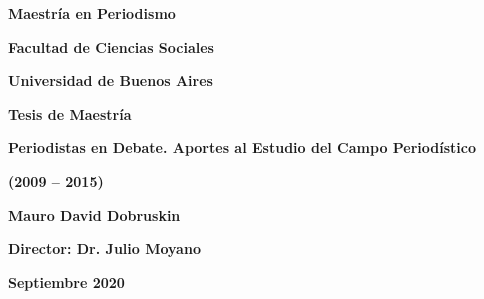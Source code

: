 



\ifPDF

\usepackage[hyphenation,homeoarchy,homeoarchywordcolor=orange, homeoarchycharcolor=orange,draft]{impnattypo}
\usepackage[allcolors=magenta, colorlinks, unicode]{hyperref}
\usepackage{easyReview}
\usepackage{hyperxmp}

	\else
	\ifBNPDF
	\usepackage[width=18truecm,height=25.5truecm,cam,center]{crop}
	\newcommand*\infofont[1]{\sf{\footnotesize #1 (alberto.alejandro.moyano@gmail.com)}}
	\crop[font=infofont]
	\usepackage[hidelinks, unicode]{hyperref}
	\usepackage{hyperxmp}
	
		\else
		\ifPNGEPUB
		\usepackage[hidelinks, unicode]{hyperref}
			\else
			\ifHTMLEPUB
			\usepackage[allcolors=blue,colorlinks,hyperindex=true,unicode]{hyperref}
			\fi
		\fi
	\fi
\fi



\frontmatter

\textbf{Maestría en Periodismo}

\textbf{Facultad de Ciencias Sociales}

\textbf{Universidad de Buenos Aires}

\textbf{Tesis de Maestría}

\textbf{Periodistas en Debate. Aportes al Estudio del Campo Periodístico}

\textbf{(2009 -- 2015)}

\textbf{Mauro David Dobruskin}

\textbf{Director: Dr. Julio Moyano}

\textbf{Septiembre 2020}

\textbf{\hfill\break
}

